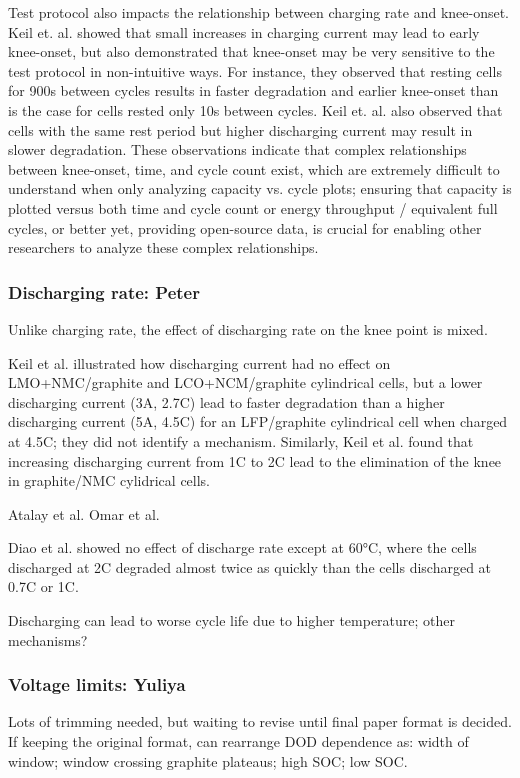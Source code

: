 \documentclass{article}
\begin{document}
Test protocol also impacts the relationship between charging rate and knee-onset. Keil et. al. \cite{keil_linear_2019} showed that small increases in charging current may lead to early knee-onset, but also demonstrated that knee-onset may be very sensitive to the test protocol in non-intuitive ways. For instance, they observed that resting cells for 900s between cycles results in faster degradation and earlier knee-onset than is the case for cells rested only 10s between cycles. Keil et. al. also observed that cells with the same rest period but higher discharging current may result in slower degradation. These observations indicate that complex relationships between knee-onset, time, and cycle count exist, which are extremely difficult to understand when only analyzing capacity vs. cycle plots; ensuring that capacity is plotted versus both time and cycle count or energy throughput / equivalent full cycles, or better yet, providing open-source data, is crucial for enabling other researchers to analyze these complex relationships. 


\subsubsection{Discharging rate: Peter}

Unlike charging rate, the effect of discharging rate on the knee point is mixed.

Keil et al.\cite{keil_charging_2016} illustrated how discharging current had no effect on LMO+NMC/graphite and LCO+NCM/graphite cylindrical cells, but a lower discharging current (3A, 2.7C) lead to faster degradation than a higher discharging current (5A, 4.5C) for an LFP/graphite cylindrical cell when charged at 4.5C; they did not identify a mechanism. 
Similarly, Keil et al.\cite{keil_linear_2019} found that increasing discharging current from 1C to 2C lead to the elimination of the knee in graphite/NMC cylidrical cells.

Atalay et al.\cite{atalay_theory_2020}
Omar et al.

Diao et al.\cite{diao_accelerated_2019} showed no effect of discharge rate except at 60°C, where the cells discharged at 2C degraded almost twice as quickly than the cells discharged at 0.7C or 1C. 

Discharging can lead to worse cycle life due to higher temperature; other mechanisms?

\subsubsection{Voltage limits: Yuliya}  
Lots of trimming needed, but waiting to revise until final paper format is decided. If keeping the original format, can rearrange DOD dependence as: width of window; window crossing graphite plateaus; high SOC; low SOC.
\end{document}
